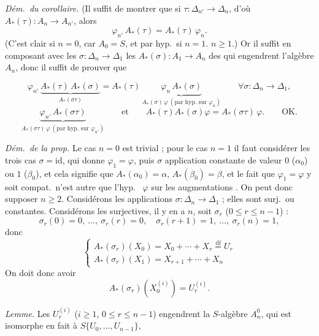 \documentclass[11pt,a4paper]{article}
\begin{document}
\emph{Dém.\ du corollaire.} (Il suffit de montrer que si
$\tau : \Delta_{n'} \to \Delta_n$, d'où $A_*(\tau) : A_n \to A_{n'}$, alors
\[
  \varphi_{n'}\, A_*(\tau) = A_*(\tau)\, \varphi_n .
\]
(C'est clair si $n = 0$, car $A_0 = S$, et par hyp.\ si $n = 1$.
 $n \geqslant 1$.)
Or il suffit  en composant avec les $\sigma : \Delta_n \to \Delta_1$
\struck{\ill{}}  les $A_*(\sigma) : A_1 \to A_n$  des \ill{} qui
engendrent l'algèbre $A_n$, donc il suffit de prouver que

\[
  \varphi_{n'}\, \underbrace{A_*(\tau)\, A_*(\sigma)}_{A_*(\sigma\tau)}
  = A_*(\tau)\, \underbrace{\varphi_n\, A_*(\sigma)}_{A_*(\sigma)\,\varphi \ (\text{par hyp.\ sur } \varphi_n)}
  \qquad \forall \sigma : \Delta_n \to \Delta_1 ,
\]
\[
  \underbrace{\varphi_{n'}\, A_*(\sigma\tau)}_{A_*(\sigma\tau)\,\varphi \ (\text{par hyp.\ sur } \varphi_{n'})}
  \qquad\text{et}\qquad A_*(\tau)A_*(\sigma)\varphi = A_*(\sigma\tau)\,\varphi .
  \qquad \text{OK.}
\]

\emph{Dém.\ de la prop.} Le cas $n = 0$ est trivial ; pour le cas
$n = 1$ il faut considérer les trois cas $\sigma = \mathrm{id}$, qui donne
$\varphi_1 = \varphi$, puis $\sigma$ application constante de valeur $0$
($\alpha_0$) ou $1$ ($\beta_0$), et cela signifie que
$A_*(\alpha_0) = \alpha$, $A_*(\beta_0) = \beta$, et le fait que
$\varphi_1 = \varphi$ y soit compat.\ n'est autre que l'hyp.\ 
$\varphi$ sur les augmentations
\add{$\alpha, \beta$}. On peut donc supposer $n \geqslant 2$. Considérons les
 applications $\sigma : \Delta_n \to \Delta_1$ ;
elles sont surj.\ ou constantes. Considérons les surjectives, il y en a $n$,
soit $\sigma_r$ ($0 \leqslant r \leqslant n-1$) :
\[
  \sigma_r(0) = 0, \ \ldots, \ \sigma_r(r) = 0, \quad
  \sigma_r(r+1) = 1, \ \ldots, \ \sigma_r(n) = 1 ,
\]
donc
\[
  \begin{cases}
    A_*(\sigma_r)(X_0) = X_0 + \cdots + X_r \overset{\mathrm{df}}{=} U_r \\
    A_*(\sigma_r)(X_1) = X_{r+1} + \cdots + X_n
  \end{cases}
\]
On doit donc avoir
\[
  A_*(\sigma_r)(X_0^{(i)}) = U_r^{(i)} .
\]

\emph{Lemme.} Les $U_r^{(i)}$ ($i \geqslant 1$, $0 \leqslant r \leqslant n-1$)
engendrent la $S$-algèbre $A_n^0$, qui est isomorphe en fait à
$S\{U_0, \ldots, U_{n-1}\}$,
\end{document}
